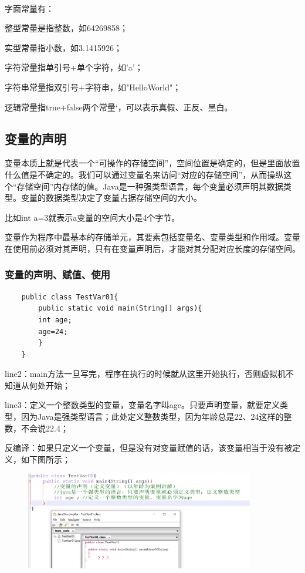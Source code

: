\documentclass{article}
\begin{document}
	\ 
	
	字面常量有：
	
	\setlength{\parindent}{4em}整型常量是指整数，如64269858；
	
	实型常量指小数，如3.1415926；
	
	字符常量指单引号+单个字符，如'a'；
	
	字符串常量指双引号+字符串，如"HelloWorld"；
	
	逻辑常量指true+false两个常量`，可以表示真假、正反、黑白。
		
	\subsection{变量的声明}
		
	\setlength{\parindent}{2em}变量本质上就是代表一个“可操作的存储空间”，空间位置是确定的，但是里面放置什么值是不确定的。我们可以通过变量名来访问“对应的存储空间”，从而操纵这个“存储空间”内存储的值。Java是一种强类型语言，每个变量必须声明其数据类型。变量的数据类型决定了变量占据存储空间的大小。
	
	比如int a=3就表示a变量的空间大小是4个字节。
	
	变量作为程序中最基本的存储单元，其要素包括变量名、变量类型和作用域。变量在使用前必须对其声明，只有在变量声明后，才能对其分配对应长度的存储空间。
	
	\subsubsection{变量的声明、赋值、使用}
	
	\begin{lstlisting}
	public class TestVar01{
	    public static void main(String[] args){
		int age;
		age=24;
	    }
	}
	\end{lstlisting}
	
	line2：main方法一旦写完，程序在执行的时候就从这里开始执行，否则虚拟机不知道从何处开始；
	
	line3：定义一个整数类型的变量，变量名字叫age。只要声明变量，就要定义类型，因为Java是强类型语言；此处定义整数类型，因为年龄总是22、24这样的整数，不会说22.4；
	
	反编译：如果只定义一个变量，但是没有对变量赋值的话，该变量相当于没有被定义，如下图所示；
	
	
	\begin{figure}[ht]
		\centering
		\includegraphics[width=100mm]{01.png}
		\label{fig:label}
	\end{figure}
\end{document}

